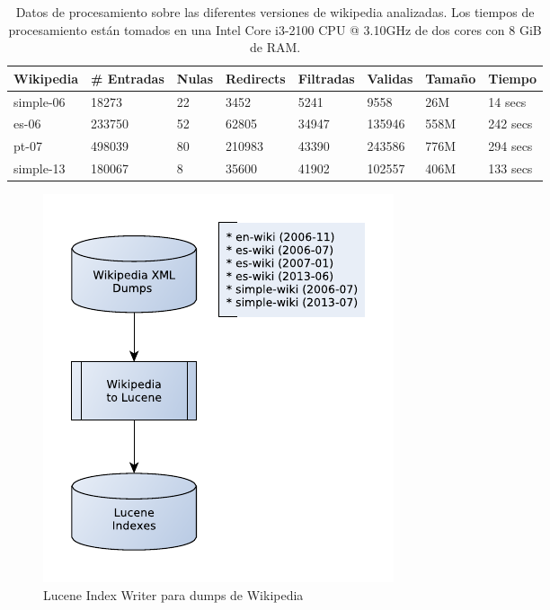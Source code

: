 \begin{table}
\centering
\begin{center}
\begin{tabular}{| l | l | l | l | l | l| l|l|}
\hline
Wikipedia & \# Entradas & Nulas & Redirects & Filtradas & Validas & Tamaño & Tiempo \\ \hline
simple-06 & 18273 & 22 &  3452 & 5241 & 9558 & 26M & 14 secs \\ \hline 
es-06 & 233750 & 52 & 62805 & 34947 & 135946 & 558M & 242 secs\\ \hline 
pt-07 & 498039 & 80 & 210983 & 43390 & 243586 & 776M & 294 secs\\ \hline 
simple-13 & 180067 & 8 & 35600 & 41902 & 102557 & 406M & 133 secs\\ \hline 
\end{tabular}
\caption{Datos de procesamiento sobre las diferentes versiones de wikipedia analizadas. Los tiempos de procesamiento están tomados en una Intel Core i3-2100 CPU @ 3.10GHz de dos cores con 8 GiB de RAM.}
\label{table:creacion-indices}
\end{center}
\end{table}


\begin{figure}[H]
  \centering
    \includegraphics{graficos/LuceneIndexWriterWiki}
  \caption{Lucene Index Writer para dumps de Wikipedia}
  \label{fig:LuceneIndexWriterWiki}
\end{figure}


